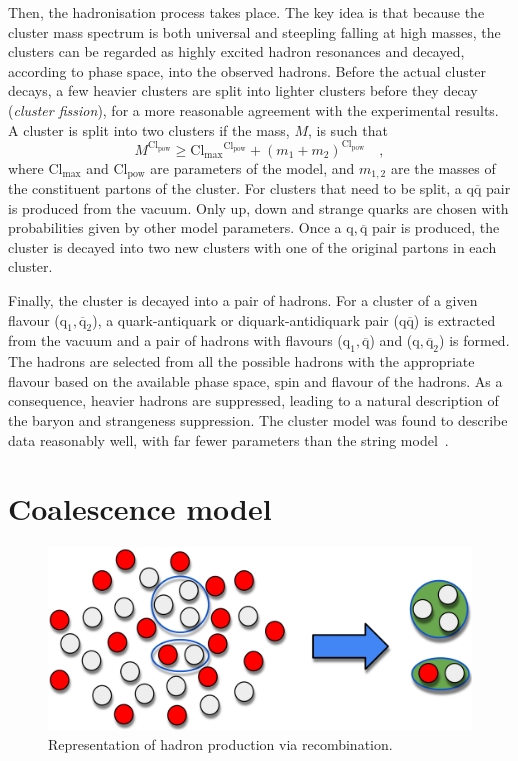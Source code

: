 Then, the hadronisation process takes place. The key idea is that because the cluster mass spectrum is both universal and steepling falling at high masses, the clusters can be regarded as highly excited hadron resonances and decayed, according to phase space, into the observed hadrons. Before the actual cluster decays, a few heavier clusters are split into lighter clusters before they decay (\emph{cluster fission}), for a more reasonable agreement with the experimental results. A cluster is split into two clusters if the mass, $M$, is such that
\begin{equation*}
    M^{\mathrm{Cl_{pow}}} \geq \mathrm{Cl_{max} {}^{Cl_{pow}}} + (m_1+m_2)^{\mathrm{Cl_{pow}}}\quad ,
\end{equation*}
where $\mathrm{Cl_{max}}$ and $\mathrm{Cl_{pow}}$ are parameters of the model, and $m_{1,2}$ are the masses of the constituent partons of the cluster. For clusters that need to be split, a $\mathrm{q\overline{q}}$ pair is produced from the vacuum. Only up, down and strange quarks are chosen with probabilities given by other model parameters. Once a $\mathrm{q, \overline{q}}$ pair is produced, the cluster is decayed into two new clusters with one of the original partons in each cluster. 

Finally, the cluster is decayed into a pair of hadrons. For a cluster of a given flavour ($\mathrm{q_1, \overline{q}_2}$), a quark-antiquark or diquark-antidiquark pair ($\mathrm{q\overline{q}}$) is extracted from the vacuum and a pair of hadrons with flavours ($\mathrm{q_1, \overline{q}}$) and ($\mathrm{q, \overline{q}_2}$) is formed. The hadrons are selected from all the possible hadrons with the appropriate flavour based on the available phase space, spin and flavour of the hadrons. As a consequence, heavier hadrons are suppressed, leading to a natural description of the baryon and strangeness suppression. The cluster model was found to describe data reasonably well, with far fewer parameters than the string model~\cite{Seymour:2013ega}.

\section{Coalescence model}
\begin{figure}[htb]
    \centering
    \includegraphics[width=0.7\linewidth]{Figures/Chapter 2/Coalescence.png}
    \caption{Representation of hadron production via recombination.}
\end{figure}

